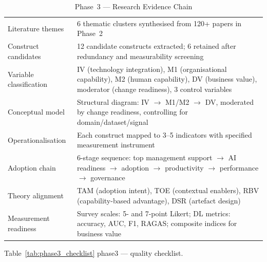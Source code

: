 \begin{xltabular}{\textwidth}{@{} p{0.16\textwidth} X @{}}
\caption{Phase~3 --- Research Evidence Chain}
\label{tab:phase3_evidence}\\
\toprule
{} &  \\
\midrule
\endfirsthead
\endhead
\bottomrule
\endlastfoot
Literature themes              & 6 thematic clusters synthesised from 120+ papers in Phase~2 \\
\addlinespace
Construct candidates           & 12 candidate constructs extracted; 6 retained after redundancy and measurability screening \\
\addlinespace
Variable classification        & IV (technology integration), M1 (organisational capability), M2 (human capability), DV (business value), moderator (change readiness), 3 control variables \\
\addlinespace
Conceptual model               & Structural diagram: IV $\rightarrow$ M1/M2 $\rightarrow$ DV, moderated by change readiness, controlling for domain/dataset/signal \\
\addlinespace
Operationalisation             & Each construct mapped to 3--5 indicators with specified measurement instrument \\
\addlinespace
Adoption chain                 & 6-stage sequence: top management support $\rightarrow$ AI readiness $\rightarrow$ adoption $\rightarrow$ productivity $\rightarrow$ performance $\rightarrow$ governance \\
\addlinespace
Theory alignment               & TAM (adoption intent), TOE (contextual enablers), RBV (capability-based advantage), DSR (artefact design) \\
\addlinespace
Measurement readiness          & Survey scales: 5- and 7-point Likert; DL metrics: accuracy, AUC, F1, RAGAS; composite indices for business value \\
\end{xltabular}
\endgroup

\vspace{1.5em}

\begingroup\singlespacing\tablefontsize\tablestripes
\noindent Table~\ref{tab:phase3_checklist} phase3 --- quality checklist.


